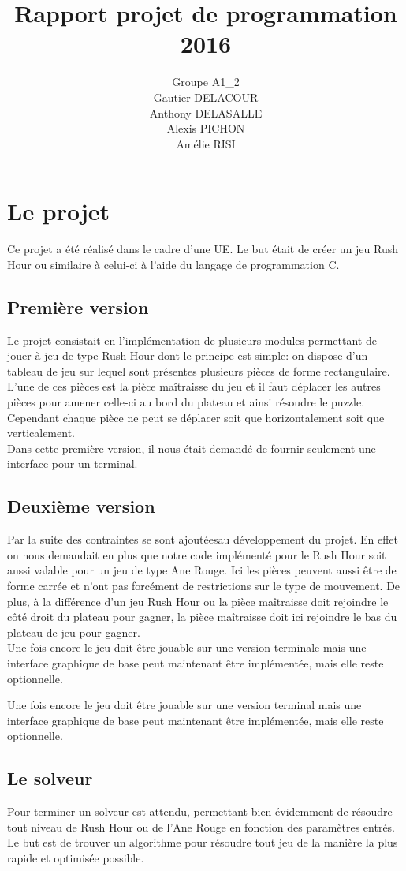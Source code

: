 \documentclass{report}
\title{Rapport projet de programmation 2016}
\author{Groupe A1\_2\\Gautier DELACOUR\\Anthony DELASALLE\\Alexis PICHON\\Amélie RISI}
\begin{document}
\maketitle
\tableofcontents

\chapter{Le projet}
Ce projet a été réalisé dans le cadre d'une UE. Le but était de créer un jeu Rush Hour ou similaire à celui-ci à l'aide du langage de programmation C.
\section{Première version}
Le projet consistait en l'implémentation de plusieurs modules permettant de jouer à jeu de type Rush Hour dont le principe est simple: on dispose d'un tableau de jeu sur lequel sont présentes plusieurs pièces de forme rectangulaire. L'une de ces pièces est la pièce maîtraisse du jeu et il faut déplacer les autres pièces pour amener celle-ci au bord du plateau et ainsi résoudre le puzzle. Cependant chaque pièce ne peut se déplacer soit que horizontalement soit que verticalement.\\
Dans cette première version, il nous était demandé de fournir seulement une interface pour un terminal.

\section{Deuxième version}
Par la suite des contraintes se sont ajoutéesau développement du projet. En effet on nous demandait en plus que notre code implémenté pour le Rush Hour soit aussi valable pour un jeu de type Ane Rouge. Ici les pièces peuvent aussi être de forme carrée et n'ont pas forcément de restrictions sur le type de mouvement. De plus, à la différence d'un jeu Rush Hour ou la pièce maîtraisse doit rejoindre le côté droit du plateau pour gagner, la pièce maîtraisse doit ici rejoindre le bas du plateau de jeu pour gagner.\\
Une fois encore le jeu doit être jouable sur une version terminale mais une interface graphique de base peut maintenant être implémentée, mais elle reste optionnelle.

Une fois encore le jeu doit être jouable sur une version terminal mais une interface graphique de base peut maintenant être implémentée, mais elle reste optionnelle.


\section{Le solveur}
Pour terminer un solveur est attendu, permettant bien évidemment de résoudre tout niveau de Rush Hour ou de l'Ane Rouge en fonction des paramètres entrés. Le but est de trouver un algorithme pour résoudre tout jeu de la manière la plus rapide et optimisée possible.
\end{document}
